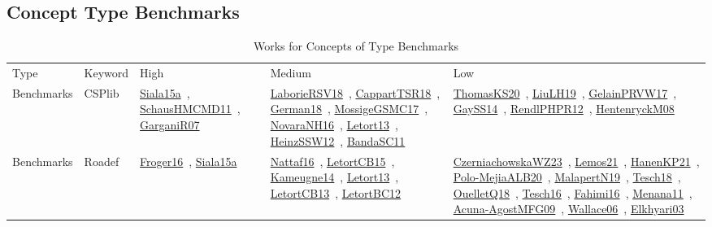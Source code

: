 \clearpage
\subsection{Concept Type Benchmarks}
\label{sec:Benchmarks}
{\scriptsize
\begin{longtable}{lp{3cm}>{\raggedright\arraybackslash}p{6cm}>{\raggedright\arraybackslash}p{6cm}>{\raggedright\arraybackslash}p{8cm}}
\rowcolor{white}\caption{Works for Concepts of Type Benchmarks}\\ \toprule
\rowcolor{white}Type & Keyword & High & Medium & Low\\ \midrule\endhead
\bottomrule
\endfoot
Benchmarks & CSPlib & \href{works/Siala15a.pdf}{Siala15a}~\cite{Siala15a}, \href{works/SchausHMCMD11.pdf}{SchausHMCMD11}~\cite{SchausHMCMD11}, \href{works/GarganiR07.pdf}{GarganiR07}~\cite{GarganiR07} & \href{works/LaborieRSV18.pdf}{LaborieRSV18}~\cite{LaborieRSV18}, \href{works/CappartTSR18.pdf}{CappartTSR18}~\cite{CappartTSR18}, \href{works/German18.pdf}{German18}~\cite{German18}, \href{works/MossigeGSMC17.pdf}{MossigeGSMC17}~\cite{MossigeGSMC17}, \href{works/NovaraNH16.pdf}{NovaraNH16}~\cite{NovaraNH16}, \href{works/Letort13.pdf}{Letort13}~\cite{Letort13}, \href{works/HeinzSSW12.pdf}{HeinzSSW12}~\cite{HeinzSSW12}, \href{works/BandaSC11.pdf}{BandaSC11}~\cite{BandaSC11} & \href{works/ThomasKS20.pdf}{ThomasKS20}~\cite{ThomasKS20}, \href{works/LiuLH19.pdf}{LiuLH19}~\cite{LiuLH19}, \href{works/GelainPRVW17.pdf}{GelainPRVW17}~\cite{GelainPRVW17}, \href{works/GaySS14.pdf}{GaySS14}~\cite{GaySS14}, \href{works/RendlPHPR12.pdf}{RendlPHPR12}~\cite{RendlPHPR12}, \href{works/HentenryckM08.pdf}{HentenryckM08}~\cite{HentenryckM08}\\
Benchmarks & Roadef & \href{works/Froger16.pdf}{Froger16}~\cite{Froger16}, \href{works/Siala15a.pdf}{Siala15a}~\cite{Siala15a} & \href{works/Nattaf16.pdf}{Nattaf16}~\cite{Nattaf16}, \href{works/LetortCB15.pdf}{LetortCB15}~\cite{LetortCB15}, \href{works/Kameugne14.pdf}{Kameugne14}~\cite{Kameugne14}, \href{works/Letort13.pdf}{Letort13}~\cite{Letort13}, \href{works/LetortCB13.pdf}{LetortCB13}~\cite{LetortCB13}, \href{works/LetortBC12.pdf}{LetortBC12}~\cite{LetortBC12} & \href{works/CzerniachowskaWZ23.pdf}{CzerniachowskaWZ23}~\cite{CzerniachowskaWZ23}, \href{works/Lemos21.pdf}{Lemos21}~\cite{Lemos21}, \href{works/HanenKP21.pdf}{HanenKP21}~\cite{HanenKP21}, \href{works/Polo-MejiaALB20.pdf}{Polo-MejiaALB20}~\cite{Polo-MejiaALB20}, \href{works/MalapertN19.pdf}{MalapertN19}~\cite{MalapertN19}, \href{works/Tesch18.pdf}{Tesch18}~\cite{Tesch18}, \href{works/OuelletQ18.pdf}{OuelletQ18}~\cite{OuelletQ18}, \href{works/Tesch16.pdf}{Tesch16}~\cite{Tesch16}, \href{works/Fahimi16.pdf}{Fahimi16}~\cite{Fahimi16}, \href{works/Menana11.pdf}{Menana11}~\cite{Menana11}, \href{works/Acuna-AgostMFG09.pdf}{Acuna-AgostMFG09}~\cite{Acuna-AgostMFG09}, \href{works/Wallace06.pdf}{Wallace06}~\cite{Wallace06}, \href{works/Elkhyari03.pdf}{Elkhyari03}~\cite{Elkhyari03}\\

\end{longtable}}
